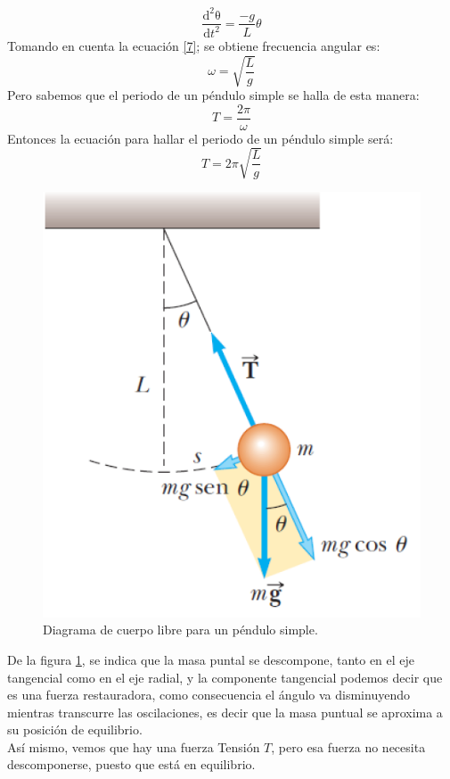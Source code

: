 \documentclass[10pt,a4paper]{article}
\begin{document}
\begin{multicols}{2}
\begin{equation}
	\frac{\mathrm{d^{2}\theta} }{\mathrm{d} t^{2}}=\frac{-g}{L}\theta
	\label{7}
\end{equation}
Tomando en cuenta la ecuación \ref{7}; se obtiene frecuencia angular es: 
\begin{equation}
	\omega = \sqrt{\frac{L}{g}}
	\label{8}
\end{equation}
Pero sabemos que el periodo de un péndulo simple se halla de esta manera:
\begin{equation}
	T = \frac{2\pi }{\omega }
	\label{9}
\end{equation}
Entonces la ecuación para hallar el periodo de un péndulo simple será:
\begin{equation}
	T = 2\pi\sqrt{\frac{L}{g}}
	\label{10}
\end{equation}
\begin{figure}[H]
	\centering
	\includegraphics[scale=0.5]{imagenes-proyecto/imagen_pendulo.png}
	\captionsetup{justification=centering}
	\caption{Diagrama de cuerpo libre para un péndulo simple.}
	\label{ima-DCL}
\end{figure}

De la figura \ref{ima-DCL}, se indica que la masa puntal se descompone, tanto en el eje tangencial como en el eje radial, y la componente tangencial podemos decir que es una fuerza restauradora, como consecuencia el ángulo va disminuyendo mientras transcurre las oscilaciones, es decir que la masa puntual se aproxima a su posición de equilibrio.\\
Así mismo, vemos que hay una fuerza Tensión $T$, pero esa fuerza no necesita descomponerse, puesto que está en equilibrio.



\end{multicols}
\end{document}
